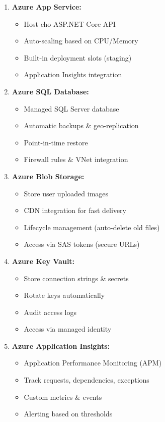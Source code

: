 \begin{enumerate}
    \item \textbf{Azure App Service:}
    \begin{itemize}
        \item Host cho ASP.NET Core API
        \item Auto-scaling based on CPU/Memory
        \item Built-in deployment slots (staging)
        \item Application Insights integration
    \end{itemize}

    \item \textbf{Azure SQL Database:}
    \begin{itemize}
        \item Managed SQL Server database
        \item Automatic backups \& geo-replication
        \item Point-in-time restore
        \item Firewall rules \& VNet integration
    \end{itemize}

    \item \textbf{Azure Blob Storage:}
    \begin{itemize}
        \item Store user uploaded images
        \item CDN integration for fast delivery
        \item Lifecycle management (auto-delete old files)
        \item Access via SAS tokens (secure URLs)
    \end{itemize}

    \item \textbf{Azure Key Vault:}
    \begin{itemize}
        \item Store connection strings \& secrets
        \item Rotate keys automatically
        \item Audit access logs
        \item Access via managed identity
    \end{itemize}

    \item \textbf{Azure Application Insights:}
    \begin{itemize}
        \item Application Performance Monitoring (APM)
        \item Track requests, dependencies, exceptions
        \item Custom metrics \& events
        \item Alerting based on thresholds
    \end{itemize}


\end{enumerate}

